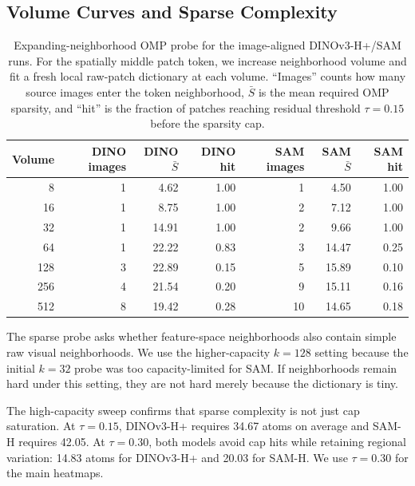 \documentclass{article}
\begin{document}
\subsection{Volume Curves and Sparse Complexity}
\begin{table}[H]
\centering
\scriptsize
\caption{Expanding-neighborhood OMP probe for the image-aligned DINOv3-H+/SAM runs. For the spatially middle patch token, we increase neighborhood volume and fit a fresh local raw-patch dictionary at each volume. ``Images'' counts how many source images enter the token neighborhood, $\bar S$ is the mean required OMP sparsity, and ``hit'' is the fraction of patches reaching residual threshold $\tau=0.15$ before the sparsity cap.}
\begin{tabular}{@{}rrrrrrr@{}}
\toprule
Volume & DINO images & DINO $\bar S$ & DINO hit & SAM images & SAM $\bar S$ & SAM hit \\
\midrule
8 & 1 & 4.62 & 1.00 & 1 & 4.50 & 1.00 \\
16 & 1 & 8.75 & 1.00 & 2 & 7.12 & 1.00 \\
32 & 1 & 14.91 & 1.00 & 2 & 9.66 & 1.00 \\
64 & 1 & 22.22 & 0.83 & 3 & 14.47 & 0.25 \\
128 & 3 & 22.89 & 0.15 & 5 & 15.89 & 0.10 \\
256 & 4 & 21.54 & 0.20 & 9 & 15.11 & 0.16 \\
512 & 8 & 19.42 & 0.28 & 10 & 14.65 & 0.18 \\
\bottomrule
\end{tabular}
\label{tab:coco-volume-sparse}
\end{table}

The sparse probe asks whether feature-space neighborhoods also contain simple raw visual neighborhoods. We use the higher-capacity $k=128$ setting because the initial $k=32$ probe was too capacity-limited for SAM. If neighborhoods remain hard under this setting, they are not hard merely because the dictionary is tiny.

The high-capacity sweep confirms that sparse complexity is not just cap saturation. At $\tau=0.15$, DINOv3-H+ requires 34.67 atoms on average and SAM-H requires 42.05. At $\tau=0.30$, both models avoid cap hits while retaining regional variation: 14.83 atoms for DINOv3-H+ and 20.03 for SAM-H. We use $\tau=0.30$ for the main heatmaps.
\end{document}
